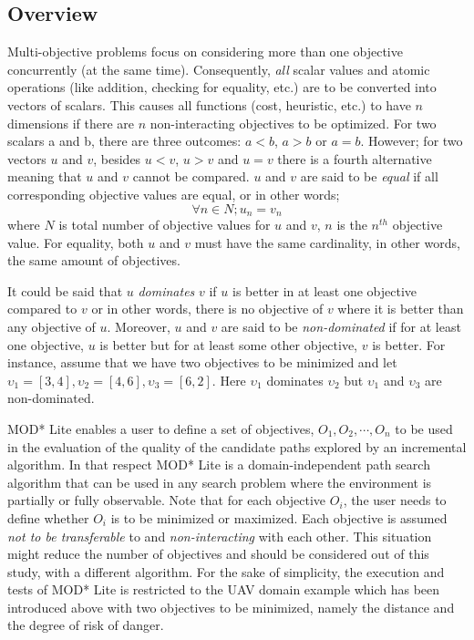 \subsection{Overview}
Multi-objective problems focus on considering more than one objective concurrently (at the same time). Consequently, \textit{all} scalar values and atomic operations (like addition, checking for equality, etc.) are to be converted into vectors of scalars. This causes all functions (cost, heuristic, etc.) to have $n$ dimensions if there are $n$ non-interacting objectives to be optimized. For two scalars a and b, there are three outcomes: $a<b$, $a>b$ or $a=b$. However; for two vectors $u$ and $v$, besides $u<v$, $u>v$ and $u=v$ there is a fourth alternative meaning that $u$ and $v$ cannot be compared. $u$ and $v$ are said to be \textit{equal} if all corresponding objective values are equal, or in other words;
\[ \forall n \in N;	 u_{n} = v_{n} \] where $N$ is total number of objective values for $u$ and $v$, $n$ is the $n^{th}$ objective value. For equality, both $u$ and $v$ must have the same cardinality, in other words, the same amount of objectives.

It could be said that $u$ \textit{dominates} $v$ if $u$ is better in at least one objective compared to $v$ or in other words, there is no objective of $v$ where it is better than any objective of $u$. Moreover, $u$ and $v$ are said to be \textit{non-dominated} if for at least one objective,  $u$ is better but for at least some other objective, $v$ is better. For instance, assume that we have two objectives to be minimized and let $\upsilon_{1}=[3,4], \upsilon_{2}=[4,6], \upsilon_{3}=[6,2] $. Here $\upsilon_{1}$ dominates $\upsilon_{2}$ but $\upsilon_{1}$ and $\upsilon_{3}$ are non-dominated.

MOD* Lite enables a user to define a set of objectives, $O_1, O_2, \cdots, O_n$ to be used in the evaluation of the quality of the candidate paths explored by an incremental algorithm. In that respect MOD* Lite is a domain-independent path search algorithm that can be used in any search problem where the environment is partially or fully observable. Note that for each objective $O_i$, the user needs to define whether $O_i$ is to be minimized or maximized. Each objective is assumed \textit{not to be transferable} to and \textit{non-interacting} with each other. This situation might reduce the number of objectives and should be considered out of this study, with a different algorithm. For the sake of simplicity, the execution and tests of MOD* Lite is restricted to the UAV domain example which has been introduced above with two objectives to be minimized, namely the distance and the degree of risk of danger.

